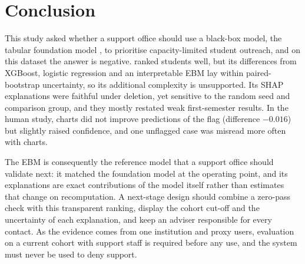 \section{Conclusion}
\label{sec:conclusion}

This study asked whether a support office should use a black-box model, the tabular foundation
model \tabicl, to prioritise capacity-limited student outreach, and on this dataset the answer is
negative. \tabicl ranked students well, but its differences from XGBoost, logistic regression and an
interpretable EBM lay within paired-bootstrap uncertainty, so its additional complexity is
unsupported. Its SHAP explanations were faithful under deletion, yet sensitive to the random seed
and comparison group, and they mostly restated weak first-semester results. In the human study,
charts did not improve predictions of the flag (difference $-0.016$) but slightly raised confidence,
and one unflagged case was misread more often with charts.

The EBM is consequently the reference model that a support office should validate next: it matched
the foundation model at the operating point, and its explanations are exact contributions of the
model itself rather than estimates that change on recomputation. A next-stage design should combine
a zero-pass check with this transparent ranking, display the cohort cut-off and the uncertainty of
each explanation, and keep an adviser responsible for every contact. As the evidence comes from one
institution and proxy users, evaluation on a current cohort with support staff is required before
any use, and the system must never be used to deny support.
